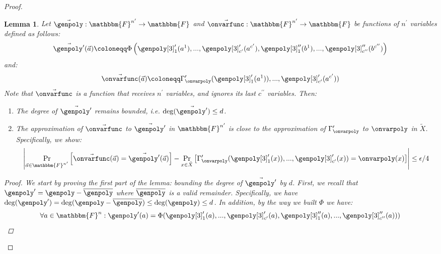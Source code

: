 \documentclass[10pt,a4paper]{article}
\newtheorem{lemma}[theorem]{Lemma}
\newcommand{\definedas}[0]{\coloneqq}
\newcommand{\parens}[1]{\left( #1 \right)}
\newcommand{\basefield}[0]{\mathbbm{F}}
\newcommand{\blocklength}[0]{n}
\newcommand{\field}[0]{\basefield^{\blocklength}}
\newcommand{\degree}[0]{d}
\newcommand{\funcdef}[3]{#1:#2\rightarrow#3}
\newcommand{\relativeremainder}[1]{\overline{#1}}
\newcommand{\variety}{{\tilde{X}}}
\newcommand{\abs}[1]{\left| #1 \right|}
\newcommand{\prex}[2]{\Pr_{#1}\left[ #2 \right]}
\begin{document}
\begin{proof}
\begin{lemma}
        Let $\funcdef{\vec{\genpoly}}{\basefield^{\blocklength^\prime}}{\basefield}$ and $\funcdef{\vec{\onvarfunc}}{\basefield^{\blocklength^{\prime}}}{\basefield}$
        be functions of $\blocklength^\prime$ variables defined as follows:
        \[
            \vec{\genpoly^{\prime}}(\vec{a}) \definedas
                \Phi \parens{\genpoly[3]^\prime_1(a^1),...,\genpoly[3]^\prime_{c^\prime}(a^{c^\prime}), \genpoly[3]^{\prime\prime}_1(b^{1}),...,\genpoly[3]^{\prime\prime}_{c^{\prime\prime}}(b^{c^{\prime\prime}})}
        \]
        and:
        \[
            \vec{\onvarfunc}(\vec{a}) \definedas \Gamma^{\prime}_{\onvarpoly}(\genpoly[3]^{\prime}_1(a^{1})),...,\genpoly[3]^{\prime}_{c^\prime}(a^{c^\prime}))
        \]
        Note that $\vec{\onvarfunc}$ is a function that receives $\blocklength^\prime$ variables, and ignores its last $c^{\prime\prime}$ variables.
        \newline
        Then:
        \begin{enumerate}
            \item The degree of $\vec{\genpoly^\prime}$ remains bounded, i.e. $\deg(\vec{\genpoly^\prime}) \leq \degree$.
            \item The approximation of $\vec{\onvarfunc}$ to $\vec{\genpoly^\prime}$ in $\basefield^{n^\prime}$ is close to the approximation of $\Gamma^{\prime}_{\onvarpoly}$ to $\onvarpoly$ in $\variety$.
            Specifically, we show:
            \[
                \abs{
                    \prex{\vec{a} \in \basefield^{\blocklength^\prime}}{\vec{\onvarfunc}(\vec{a}) = \vec{\genpoly^\prime}(\vec{a})} -
                    \prex{x \in \variety}{\Gamma^{\prime}_{\onvarpoly}(\genpoly[3]^{\prime}_1(x)),...,\genpoly[3]^{\prime}_{c^\prime}(x)) =\onvarpoly(x)}
                }
                \leq \epsilon/4
            \]
        \end{enumerate}
        \begin{proof}
            We start by proving the first part of the lemma: bounding the degree of $\vec{\genpoly^\prime}$ by $\degree$.
            First, we recall that $\genpoly^{\prime} = \genpoly - \relativeremainder{\genpoly}$ where $\relativeremainder{\genpoly}$ is a valid remainder.
            Specifically, we have $\deg(\genpoly^{\prime}) = \deg(\genpoly - \relativeremainder{\genpoly}) \leq \deg(\genpoly) \leq \degree$.
            In addition, by the way we built $\Phi$ we have:
            \[
                \forall a \in \field: \genpoly^\prime(a) = \Phi(\genpoly[3]^\prime_1(a),...,\genpoly[3]^\prime_{c^\prime}(a), \genpoly[3]^{\prime\prime}_1(a),...,\genpoly[3]^{\prime\prime}_{c^{\prime\prime}}(a)))
\]
\end{proof}
\end{lemma}
\end{proof}
\end{document}
